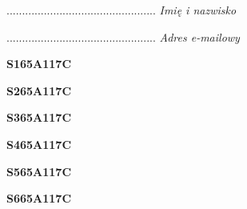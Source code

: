 \begin{turn}{90}\begin{minipage}{\linewidth} \vspace{20mm} ................................................  \textit{Imię i nazwisko}\end{minipage}\end{turn}

\begin{turn}{90}\begin{minipage}{\linewidth} \vspace{20mm} ................................................  \textit{Adres e-mailowy}\end{minipage}\end{turn}

\begin{turn}{90}\huge \begin{minipage}{\linewidth} \vspace{10mm}\textbf{S165A117C}\end{minipage}\end{turn}

\begin{turn}{90}\huge \begin{minipage}{\linewidth} \vspace{10mm}\textbf{S265A117C}\end{minipage}\end{turn}

\begin{turn}{90}\huge \begin{minipage}{\linewidth} \vspace{10mm}\textbf{S365A117C}\end{minipage}\end{turn}

\begin{turn}{90}\huge \begin{minipage}{\linewidth} \vspace{10mm}\textbf{S465A117C}\end{minipage}\end{turn}

\begin{turn}{90}\huge \begin{minipage}{\linewidth} \vspace{10mm}\textbf{S565A117C}\end{minipage}\end{turn}

\begin{turn}{90}\huge \begin{minipage}{\linewidth} \vspace{10mm}\textbf{S665A117C}\end{minipage}\end{turn}

